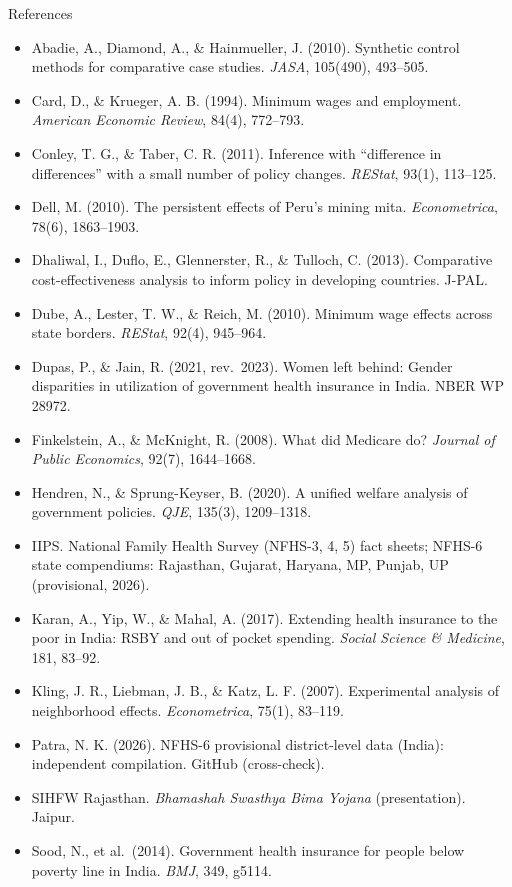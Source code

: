 \documentclass[compress]{beamer}
\begin{document}
\begin{frame}[t]{References}
\tiny
\begin{itemize}
\item Abadie, A., Diamond, A., \& Hainmueller, J. (2010). Synthetic control methods for comparative case studies. \emph{JASA}, 105(490), 493--505.
\item Card, D., \& Krueger, A. B. (1994). Minimum wages and employment. \emph{American Economic Review}, 84(4), 772--793.
\item Conley, T. G., \& Taber, C. R. (2011). Inference with ``difference in differences'' with a small number of policy changes. \emph{REStat}, 93(1), 113--125.
\item Dell, M. (2010). The persistent effects of Peru's mining mita. \emph{Econometrica}, 78(6), 1863--1903.
\item Dhaliwal, I., Duflo, E., Glennerster, R., \& Tulloch, C. (2013). Comparative cost-effectiveness analysis to inform policy in developing countries. J-PAL.
\item Dube, A., Lester, T. W., \& Reich, M. (2010). Minimum wage effects across state borders. \emph{REStat}, 92(4), 945--964.
\item Dupas, P., \& Jain, R. (2021, rev.\ 2023). Women left behind: Gender disparities in utilization of government health insurance in India. NBER WP 28972.
\item Finkelstein, A., \& McKnight, R. (2008). What did Medicare do? \emph{Journal of Public Economics}, 92(7), 1644--1668.
\item Hendren, N., \& Sprung-Keyser, B. (2020). A unified welfare analysis of government policies. \emph{QJE}, 135(3), 1209--1318.
\item IIPS. National Family Health Survey (NFHS-3, 4, 5) fact sheets; NFHS-6 state compendiums: Rajasthan, Gujarat, Haryana, MP, Punjab, UP (provisional, 2026).
\item Karan, A., Yip, W., \& Mahal, A. (2017). Extending health insurance to the poor in India: RSBY and out of pocket spending. \emph{Social Science \& Medicine}, 181, 83--92.
\item Kling, J. R., Liebman, J. B., \& Katz, L. F. (2007). Experimental analysis of neighborhood effects. \emph{Econometrica}, 75(1), 83--119.
\item Patra, N. K. (2026). NFHS-6 provisional district-level data (India): independent compilation. GitHub (cross-check).
\item SIHFW Rajasthan. \emph{Bhamashah Swasthya Bima Yojana} (presentation). Jaipur.
\item Sood, N., et al.\ (2014). Government health insurance for people below poverty line in India. \emph{BMJ}, 349, g5114.
\end{itemize}
\end{frame}
\end{document}
